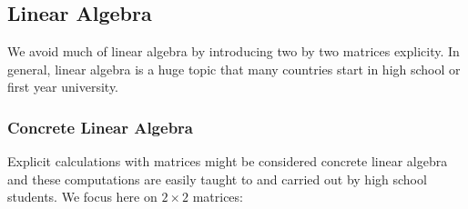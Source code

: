 \documentclass{article}
\theoremstyle{definition}
\theoremstyle{definition}
\theoremstyle{definition}
\newcommand{\SLZ}{\operatorname{SL}_2(\mathbb{Z})}
\newcommand{\Z}{\mathbb{Z}}
\begin{document}
\subsection{Linear Algebra}

We avoid much of linear algebra by introducing two by two matrices explicity. In general, linear algebra is a huge topic that many countries start in high school or first year university.

\subsubsection{Concrete Linear Algebra}

Explicit calculations with matrices might be considered concrete linear algebra and these computations are easily taught to and carried out by high school students.
\newline\newline
We focus here on $2\times 2$ matrices:

\end{document}
